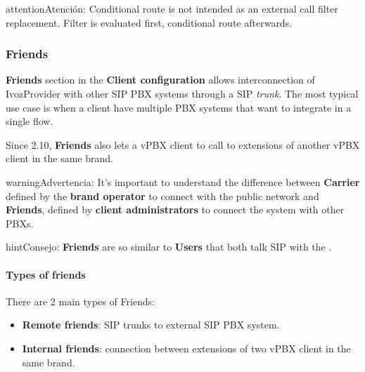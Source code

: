 \documentclass[letterpaper,10pt,spanish]{sphinxmanual}
\begin{document}
\begin{notice}{attention}{Atención:}
Conditional route is not intended as an external call filter
replacement. Filter is evaluated first, conditional route afterwards.
\end{notice}


\subsubsection{Friends}
\label{administration_portal/client/vpbx/routing_endpoints/friends/index:friends}\label{administration_portal/client/vpbx/routing_endpoints/friends/index::doc}\label{administration_portal/client/vpbx/routing_endpoints/friends/index:id1}
\textbf{Friends} section in the \textbf{Client configuration} allows interconnection of
IvozProvider with other SIP PBX systems through a SIP \emph{trunk}. The most typical
use case is when a client have multiple PBX systems that want to integrate in
a single flow.

Since 2.10, \textbf{Friends} also lets a vPBX client to call to extensions of another
vPBX client in the same brand.

\begin{notice}{warning}{Advertencia:}
It's important to understand the difference between \textbf{Carrier}
defined by the \textbf{brand operator} to connect with the public network
and \textbf{Friends}, defined by \textbf{client administrators} to connect the
system with other PBXs.
\end{notice}

\begin{notice}{hint}{Consejo:}
\textbf{Friends} are so similar to \textbf{Users} that both talk SIP with the
{\hyperref[administration_portal/platform/infrastructure/proxy_users:proxyusers]{}}.
\end{notice}


\paragraph{Types of friends}
\label{administration_portal/client/vpbx/routing_endpoints/friends/index:types-of-friends}
There are 2 main types of Friends:
\begin{itemize}
\item {} 
\textbf{Remote friends}: SIP trunks to external SIP PBX system.

\item {} 
\textbf{Internal friends}: connection between extensions of two vPBX client in the same brand.

\end{itemize}
\end{document}
